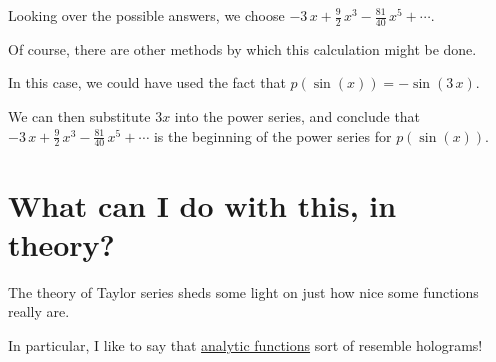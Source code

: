 \documentclass{ximera}
\begin{document}
\begin{question}
\begin{solution}
\begin{hint}
                \end{hint}
                \begin{hint}
                  Looking over the possible answers, we choose \(-3 \, x+ \displaystyle\frac{9}{2} \, x^{3}-\displaystyle\frac{81}{40} \, x^{5}+ \cdots \).
                \end{hint}
                \begin{hint}
                  Of course, there are other methods by which this calculation might be done.
                \end{hint}
                \begin{hint}
                  In this case, we could have used the fact that  \(p(\sin\left(x\right)) = -\sin\left(3 \, x\right)\).
                \end{hint}
                \begin{hint}
                  We can then substitute \(3x\) into the power series, and conclude that \(-3 \, x+ \displaystyle\frac{9}{2} \, x^{3}-\displaystyle\frac{81}{40} \, x^{5}+ \cdots \) is the beginning of the power series for \(p(\sin\left(x\right))\).

                \end{hint}


              \begin{multiple-choice}

              \end{multiple-choice}

              \end{solution}
            \end{question}
            

\section{What can I do with this, in theory?}

The theory of Taylor series sheds some light on just how nice some functions really are.


In particular, I like to say that \href{http://en.wikipedia.org/wiki/Analytic_function}{analytic functions} sort of resemble holograms!

\end{document}
